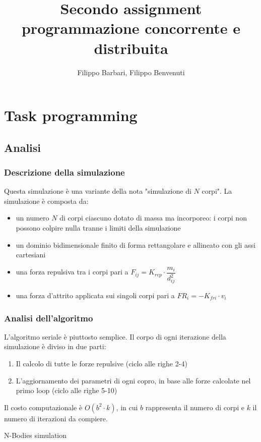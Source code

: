 \documentclass[12pt,a4paper,oneside]{article}
\begin{document}
	
	\title{Secondo assignment programmazione concorrente e distribuita}
	\author{Filippo Barbari, Filippo Benvenuti}
	\date{}%
	\maketitle
	
	\tableofcontents
	\newpage
	
	\section{Task programming}
	\subsection{Analisi}
	\subsubsection{Descrizione della simulazione}
	Questa simulazione è una variante della nota "simulazione di $N$ corpi". La simulazione è composta da:
	\begin{itemize}
		\item un numero $N$ di corpi ciascuno dotato di massa ma incorporeo: i corpi non possono colpire nulla tranne i limiti della simulazione
		\item un dominio bidimensionale finito di forma rettangolare e allineato con gli assi cartesiani
		\item una forza repulsiva tra i corpi pari a $F_{ij}=K_{rep}\cdot\dfrac{m_i}{d_{ij}^2}$
		\item una forza d'attrito applicata sui singoli corpi pari a $FR_i=-K_{fri}\cdot{v_i}$
	\end{itemize}
	
	\subsubsection{Analisi dell'algoritmo}
	L'algoritmo seriale è piuttosto semplice. Il corpo di ogni iterazione della simulazione è diviso in due parti:
	\begin{enumerate}
		\item Il calcolo di tutte le forze repulsive (ciclo alle righe 2-4)
		\item L'aggiornamento dei parametri di ogni copro, in base alle forze calcolate nel primo loop (ciclo alle righe 5-10)
	\end{enumerate}
	Il costo computazionale è $O(b^2\cdot k)$, in cui $b$ rappresenta il numero di corpi e $k$ il numero di iterazioni da compiere.
	\begin{algorithm}
		
		\caption{N-Bodies simulation}
	\end{algorithm}
	
\end{document}
